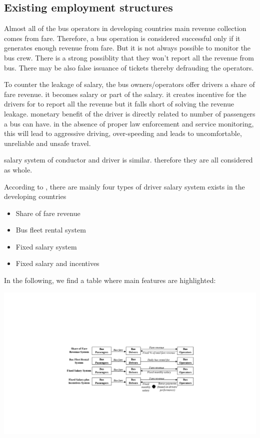 \documentclass[11pt,]{article}
\let\origfigure\figure
\let\endorigfigure\endfigure
\renewenvironment{figure}[1][2] {
    \expandafter\origfigure\expandafter[H]
} {
    \endorigfigure
}
\begin{document}
\subsection{Existing employment
structures}\label{existing-employment-structures}

Almost all of the bus operators in developing countries main revenue
collection comes from fare. Therefore, a bus operation is considered
successful only if it generates enough revenue from fare. But it is not
always possible to monitor the bus crew. There is a strong possiblity
that they won't report all the revenue from bus. There may be also false
issuance of tickets thereby defrauding the operators.

To counter the leakage of salary, the bus owners/operators offer drivers
a share of fare revenue. it becomes salary or part of the salary. it
creates incentive for the drivers for to report all the revenue but it
falls short of solving the revenue leakage. monetary benefit of the
driver is directly related to number of passengers a bus can have. in
the absence of proper law enforcement and service monitoring, this will
lead to aggressive driving, over-speeding and leads to uncomfortable,
unreliable and unsafe travel.

salary system of conductor and driver is similar. therefore they are all
considered as whole.

According to \textcite{htun_influence_2012}, there are mainly four types
of driver salary system exists in the developing countries

\begin{itemize}
\item
  Share of fare revenue
\item
  Bus fleet rental system
\item
  Fixed salary system
\item
  Fixed salary and incentives
\end{itemize}

In the following, we find a table where main features are highlighted:

\begin{figure}
\centering
\includegraphics{./figures/emp_str_flow.pdf}
\caption{\textbf{Figure 1:} fig\_title}
\end{figure}
\end{document}
